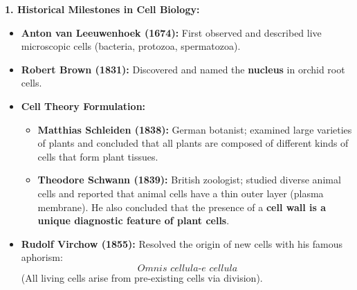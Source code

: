\documentclass[10pt,twoside,openright]{book}
\begin{document}
\begin{conceptbox}
\textbf{1. Historical Milestones in Cell Biology:}
\begin{itemize}
  \item \textbf{Anton van Leeuwenhoek (1674):} First observed and described live microscopic cells (bacteria, protozoa, spermatozoa).
  \item \textbf{Robert Brown (1831):} Discovered and named the \textbf{nucleus} in orchid root cells.
  \item \textbf{Cell Theory Formulation:}
  \begin{itemize}
    \item \textbf{Matthias Schleiden (1838):} German botanist; examined large varieties of plants and concluded that all plants are composed of different kinds of cells that form plant tissues.
    \item \textbf{Theodore Schwann (1839):} British zoologist; studied diverse animal cells and reported that animal cells have a thin outer layer (plasma membrane). He also concluded that the presence of a \textbf{cell wall is a unique diagnostic feature of plant cells}.
  \end{itemize}
  \item \textbf{Rudolf Virchow (1855):} Resolved the origin of new cells with his famous aphorism:
  \[
    \mathbf{\textit{Omnis cellula-e cellula}}
  \]
  (All living cells arise from pre-existing cells via division).
\end{itemize}


\end{conceptbox}
\end{document}
